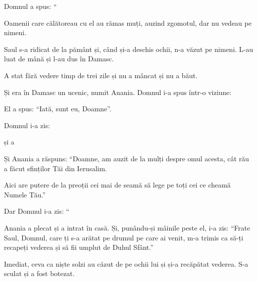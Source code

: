 {\par }{\PP Domnul a spus: “{}



\par }{\PP {}Oamenii care călătoreau cu el au rămas muți, auzind zgomotul, dar nu vedeau pe nimeni.

Saul s-a ridicat de la pământ și, când și-a deschis ochii, n-a văzut pe nimeni. L-au luat de mână și l-au dus în Damasc.

A stat fără vedere timp de trei zile și nu a mâncat și nu a băut.


\par }{\PP {}Și era în Damasc un ucenic, numit Anania. Domnul i-a spus într-o viziune:
{}

\par }{\PP El a spus: “Iată, sunt eu, Doamne”.


\par }{\PP {}Domnul i-a zis:
{}

și a
{}


\par }{\PP {}Și Anania a răspuns: “Doamne, am auzit de la mulți despre omul acesta, cât rău a făcut sfinților Tăi din Ierusalim.

Aici are putere de la preoții cei mai de seamă să lege pe toți cei ce cheamă Numele Tău.”


\par }{\PP {}Dar Domnul i-a zis: “{}



\par }{\PP {}Anania a plecat și a intrat în casă. Și, punându-și mâinile peste el, i-a zis: “Frate Saul, Domnul, care ți s-a arătat pe drumul pe care ai venit, m-a trimis ca să-ți recapeți vederea și să fii umplut de Duhul Sfânt.”

Imediat, ceva ca niște solzi au căzut de pe ochii lui și și-a recăpătat vederea. S-a sculat și a fost botezat.

}
